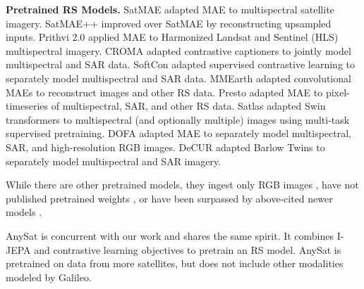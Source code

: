 \textbf{Pretrained RS Models.} \label{sec:pretrained_rs} SatMAE \cite{cong2022satmae} adapted MAE to multispectral satellite imagery. SatMAE++ \cite{noman2024rethinking} improved over SatMAE by reconstructing upsampled inputs. Prithvi 2.0 \cite{szwarcman2024prithvi} applied MAE to Harmonized Landsat and Sentinel (HLS) multispectral imagery. CROMA \cite{fuller2024croma} adapted contrastive captioners \cite{yu2022coca} to jointly model multispectral and SAR data. SoftCon \cite{wang2024multi} adapted supervised contrastive learning \cite{khosla2020supervised, zhang2022use} to separately model multispectral and SAR data. MMEarth \cite{nedungadi2024mmearth} adapted convolutional MAEs \cite{woo2023convnext} to reconstruct images and other RS data. Presto \cite{tseng2023lightweight} adapted MAE to pixel-timeseries of multispectral, SAR, and other RS data. Satlas \cite{bastani2023satlaspretrain} adapted Swin transformers \cite{liu2021swin} to multispectral (and optionally multiple) images using multi-task supervised pretraining. DOFA \cite{xiong2024neural} adapted MAE to separately model multispectral, SAR, and high-resolution RGB images. DeCUR \cite{wang2024decoupling} adapted Barlow Twins \cite{zbontar2021barlow} to separately model multispectral and SAR imagery. 

While there are other pretrained models, they ingest only RGB images \cite{reed2023scale, tang2024cross, mendieta2023towards}, have not published pretrained weights \cite{guo2024skysense, han2024bridging}, or have been surpassed by above-cited newer models \cite{fuller2022satvit, wang2023ssl4eo, ayush2021geography, manas2021seasonal, jean2019tile2vec, astruc2024omnisat, jakubik2023foundation}. 

AnySat \cite{astruc2024anysat} is concurrent with our work and shares the same spirit.
It combines I-JEPA \cite{assran2023self} and contrastive learning objectives to pretrain an RS model.
AnySat is pretrained on data from more satellites, but does not include other modalities modeled by Galileo.